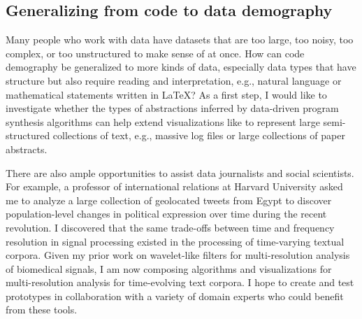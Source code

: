 \documentclass[justified]{tufte-handout}
\begin{document}
\subsection{Generalizing from code to data demography}

Many people who work with data have datasets that are too large, too noisy, too complex, or too unstructured to make sense of at once. How can code demography be generalized to more kinds of data, especially data types that have structure but also require reading and interpretation, e.g., natural language or mathematical statements written in \LaTeX{}?
As a first step, I would like to investigate whether the types of abstractions inferred by data-driven program synthesis algorithms can help extend visualizations like  to represent large semi-structured collections of text, e.g., massive log files or large collections of paper abstracts.  

There are also ample opportunities to assist data journalists and social scientists. For example, a professor of international relations at Harvard University asked me to analyze a large collection of geolocated tweets from Egypt to discover population-level changes in political expression over time during the recent revolution. 
I discovered that the same trade-offs between time and frequency resolution in signal processing existed in the processing of time-varying textual corpora.
Given my prior work on wavelet-like filters for multi-resolution analysis of biomedical signals,\cite{snap} I am now composing algorithms and visualizations for multi-resolution analysis for time-evolving text corpora. I hope to create and test prototypes in collaboration with a variety of domain experts who could benefit from these tools.

\end{document}
